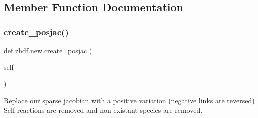 \subsection{Member Function Documentation}
\mbox{\label{classzhdf_1_1new_ac2f471d2887d2c09c702bb16e06dda73}} 
\subsubsection{\texorpdfstring{create\+\_\+posjac()}{create\_posjac()}\hspace{0.1cm}{\footnotesize\ttfamily [1/2]}}
{\footnotesize\ttfamily def zhdf.\+new.\+create\+\_\+posjac (\begin{DoxyParamCaption}\item[{}]{self }\end{DoxyParamCaption})}

\begin{DoxyVerb}Replace our sparse jacobian with a positive variation (negative links are reversed)
Self reactions are removed and non existant species are removed.
\end{DoxyVerb}
 
